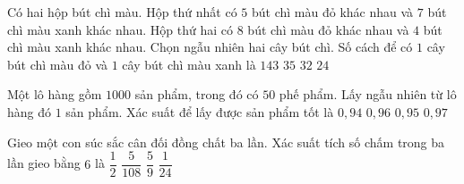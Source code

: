 \begin{ex}%
	Có hai hộp bút chì màu. Hộp thứ nhất có $5$ bút chì màu đỏ khác nhau và $7$ bút chì màu xanh khác nhau. Hộp thứ hai có $8$ bút chì màu đỏ khác nhau và $4$ bút chì màu xanh khác nhau. Chọn ngẫu nhiên hai cây bút  chì. Số cách để có $1$ cây bút chì màu đỏ và $1$ cây bút chì màu xanh là
	 \choice
		{\True $143$} 
		{$35$} 
		{$32$} 
		{$24$} 
\end{ex}

\begin{ex}%
	Một lô hàng gồm $1000$ sản phẩm,  trong đó có $50$ phế phẩm. Lấy ngẫu nhiên từ lô hàng đó $1$ sản phẩm. Xác suất để lấy được sản phẩm tốt là
	 \choice
		{$0{,}94$} 
		{$0{,}96$} 
		{\True  $0{,}95$}
		 {$0{,}97$}
\end{ex}

\begin{ex}%
	Gieo một con súc sắc cân đối đồng chất ba lần.  Xác suất tích số chấm trong ba lần gieo bằng $6$ là
	 \choice
		{$\dfrac{1}{2}$} 
		{$\dfrac{5}{108}$} 
		 {$\dfrac{5}{9}$}
		{\True $\dfrac{1}{24}$} 
\end{ex}

